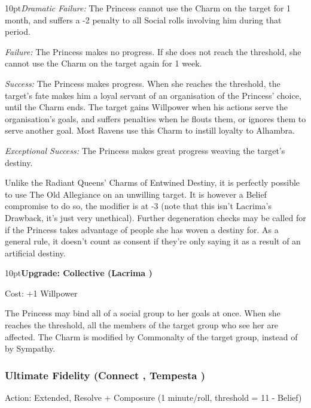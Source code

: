 \begin{myindentpar}{10pt}\emph{Dramatic Failure:} The Princess cannot use the Charm on the target for 1 month, and suffers a -2 penalty to all Social rolls involving him during that period.

\emph{Failure:} The Princess makes no progress. If she does not reach the threshold, she cannot use the Charm on the target again for 1 week.

\emph{Success:} The Princess makes progress. When she reaches the threshold, the target's fate makes him a loyal servant of an organisation of the Princess' choice, until the Charm ends. The target gains Willpower when his actions serve the organisation's goals, and suffers penalties when he flouts them, or ignores them to serve another goal. Most Ravens use this Charm to instill loyalty to Alhambra. 

\emph{Exceptional Success:} The Princess makes great progress weaving the target's destiny.\end{myindentpar}

\noindent Unlike the Radiant Queens' Charms of Entwined Destiny, it is perfectly possible to use The Old Allegiance on an unwilling target. It is however a Belief compromise to do so, the modifier is at -3 (note that this isn't Lacrima's Drawback, it's just very unethical). Further degeneration checks may be called for if the Princess takes advantage of people she has woven a destiny for. As a general rule, it doesn't count as consent if they're only saying it as a result of an artificial destiny.

\begin{myindentpar}{10pt}\textbf{Upgrade: Collective (Lacrima \textbullet\textbullet\textbullet\textbullet)}

Cost: +1 Willpower

The Princess may bind all of a social group to her goals at once. When she reaches the threshold, all the members of the target group who see her are affected. The Charm is modified by Commonalty of the target group, instead of by Sympathy.\end{myindentpar}

\subsubsection*{Ultimate Fidelity (Connect \textbullet\textbullet\textbullet\textbullet, Tempesta \textbullet\textbullet\textbullet)}

\noindent Action: Extended, Resolve + Composure (1 minute/roll, threshold = 11 - Belief)

